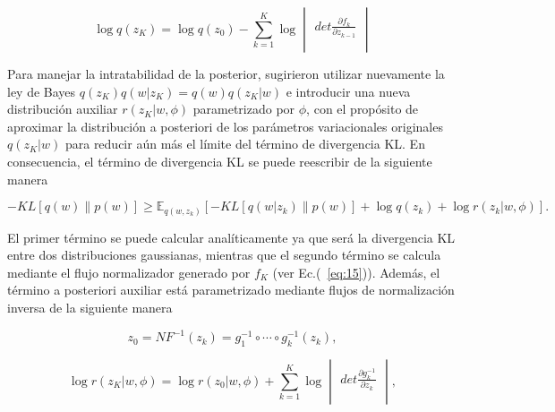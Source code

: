 \documentclass[10pt, oneside, a4paper]{article}
\begin{document}
	\begin{equation} \label{eq:15}
	\log q(z_{K}) = \log q(z_{0}) - \sum_{k = 1}^{K} \log \begin{vmatrix}
		\\
		det \frac{\partial f_{k}}{\partial z_{k-1}} \\
		\\ 
	\end{vmatrix}
	\end{equation}	

	Para manejar la intratabilidad de la posterior, \cite{pmlr-v70-louizos17a} sugirieron utilizar nuevamente la ley de Bayes $q(z_{K})q(w|z_{K}) = q(w)q(z_{K}|w)$ e introducir una nueva distribución auxiliar $r(z_{K}|w, \phi)$ parametrizado por $\phi$, con el propósito de aproximar la distribución a posteriori de los parámetros variacionales originales $q(z_{K}|w)$ para reducir aún más el límite del término de divergencia KL. En consecuencia, el término de divergencia KL se puede reescribir de la siguiente manera
	
	\begin{equation} \label{eq:16}
	-KL \left[ q(w) \parallel p(w) \right] \geq \mathbb{E}_{q(w,z_{k})} \left[ -KL \left[ q(w|z_{k}) \parallel p(w) \right] + \log q(z_{k}) + \log r(z_{k} | w, \phi) \right].
	\end{equation}
	
	El primer término se puede calcular analíticamente ya que será la divergencia KL entre dos distribuciones gaussianas, mientras que el segundo término se calcula mediante el flujo normalizador generado por $f_{K}$ (ver Ec.(~\ref{eq:15})). Además, el término a posteriori auxiliar está parametrizado mediante flujos de normalización inversa de la siguiente manera
	
	\begin{equation} \label{eq:17}
	z_{0} = NF^{-1}(z_{k}) = g_{1}^{-1} \circ \cdots \circ g_{k}^{-1}(z_{k}),
	\end{equation}	
	
	\begin{equation} \label{eq:18}
	\log r(z_{K}|w, \phi) = \log r(z_{0}|w, \phi) + \sum_{k = 1}^{K} \log \begin{vmatrix}
		\\
		det \frac{\partial g_{k}^{-1}}{\partial z_{k}} \\
		\\
	\end{vmatrix},
	\end{equation}
\end{document}
